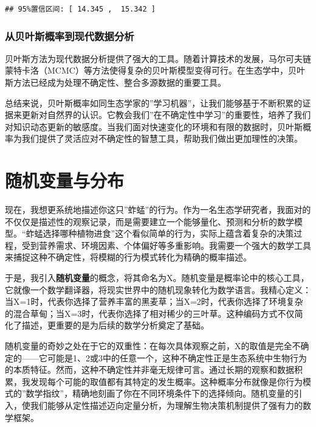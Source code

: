 \documentclass[
  twoside]{book}
\begin{document}
\begin{verbatim}
## 95%置信区间: [ 14.345 ,  15.342 ]
\end{verbatim}

\hypertarget{ux4eceux8d1dux53f6ux65afux6982ux7387ux5230ux73b0ux4ee3ux6570ux636eux5206ux6790}{%
\subsubsection{从贝叶斯概率到现代数据分析}\label{ux4eceux8d1dux53f6ux65afux6982ux7387ux5230ux73b0ux4ee3ux6570ux636eux5206ux6790}}

贝叶斯方法为现代数据分析提供了强大的工具。随着计算技术的发展，马尔可夫链蒙特卡洛（MCMC）等方法使得复杂的贝叶斯模型变得可行。在生态学中，贝叶斯方法已经成为处理不确定性、整合多源数据的重要工具。

总结来说，贝叶斯概率如同生态学家的''学习机器''，让我们能够基于不断积累的证据来更新对自然界的认识。它教会我们''在不确定性中学习''的重要性，培养了我们对知识动态更新的敏感度。当我们面对快速变化的环境和有限的数据时，贝叶斯概率为我们提供了灵活应对不确定性的智慧工具，帮助我们做出更加理性的决策。

\hypertarget{ux968fux673aux53d8ux91cfux4e0eux5206ux5e03}{%
\section{随机变量与分布}\label{ux968fux673aux53d8ux91cfux4e0eux5206ux5e03}}

现在，我想更系统地描述你这只''蚱蜢''的行为。作为一名生态学研究者，我面对的不仅仅是描述性的观察记录，而是需要建立一个能够量化、预测和分析的数学模型。``蚱蜢选择哪种植物进食''这个看似简单的行为，实际上蕴含着复杂的决策过程，受到营养需求、环境因素、个体偏好等多重影响。我需要一个强大的数学工具来捕捉这种不确定性，将模糊的行为模式转化为精确的概率描述。

于是，我引入\textbf{随机变量}的概念，将其命名为X。随机变量是概率论中的核心工具，它就像一个数学翻译器，将现实世界中的随机现象转化为数学语言。我精心定义：当X=1时，代表你选择了营养丰富的黑麦草；当X=2时，代表你选择了环境复杂的混合草甸；当X=3时，代表你选择了相对稀少的三叶草。这种编码方式不仅简化了描述，更重要的是为后续的数学分析奠定了基础。

随机变量的奇妙之处在于它的双重性：在每次具体观察之前，X的取值是完全不确定的------它可能是1、2或3中的任意一个，这种不确定性正是生态系统中生物行为的本质特征。然而，这种不确定性并非毫无规律可言。通过长期的观察和数据积累，我发现每个可能的取值都有其特定的发生概率。这种概率分布就像是你行为模式的''数学指纹''，精确地刻画了你在不同环境条件下的选择倾向。随机变量的引入，使我们能够从定性描述迈向定量分析，为理解生物决策机制提供了强有力的数学框架。
\end{document}
